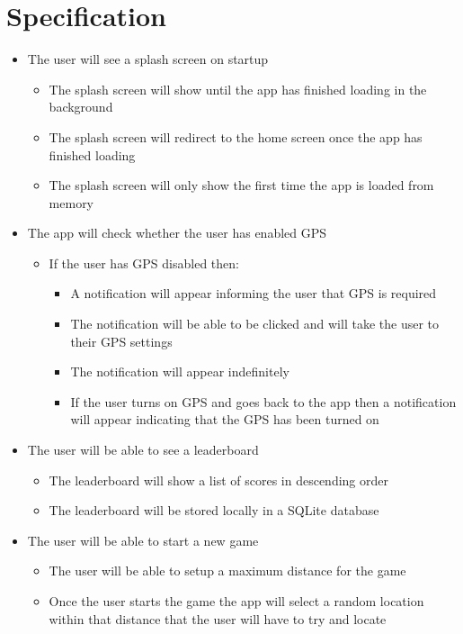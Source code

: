 \documentclass[10pt, a4paper]{article}
\begin{document}
\section*{Specification}
\begin{itemize}
\item The user will see a splash screen on startup
\begin{itemize}
\item The splash screen will show until the app has finished loading in the background
\item The splash screen will redirect to the home screen once the app has finished loading
\item The splash screen will only show the first time the app is loaded from memory
\end{itemize}

\item The app will check whether the user has enabled GPS
  \begin{itemize}
  \item If the user has GPS disabled then:
  \begin{itemize}
    \item A notification will appear informing the user that GPS is required
    \item The notification will be able to be clicked and will take the user to their GPS settings
    \item The notification will appear indefinitely
    \item If the user turns on GPS and goes back to the app then a notification will appear indicating that the GPS has been turned on
  \end{itemize}
\end{itemize}

\item The user will be able to see a leaderboard
	\begin{itemize}
		\item The leaderboard will show a list of scores in descending order
        \item The leaderboard will be stored locally in a SQLite database
	\end{itemize}

\item The user will be able to start a new game
	\begin{itemize}
		\item The user will be able to setup a maximum distance for the game
        \item Once the user starts the game the app will select a random location within that distance that the user will have to try and locate
	\end{itemize}
    

\end{itemize}
\end{document}
